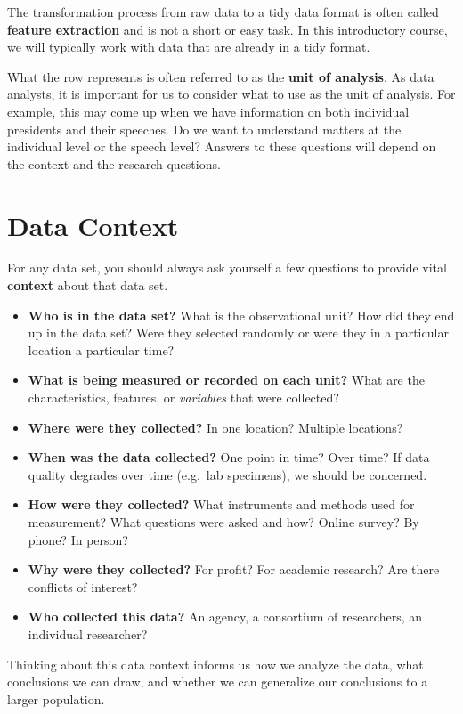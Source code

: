 \documentclass[
]{book}
\begin{document}
The transformation process from raw data to a tidy data format is often called \textbf{feature extraction} and is not a short or easy task. In this introductory course, we will typically work with data that are already in a tidy format.

What the row represents is often referred to as the \textbf{unit of analysis}. As data analysts, it is important for us to consider what to use as the unit of analysis. For example, this may come up when we have information on both individual presidents and their speeches. Do we want to understand matters at the individual level or the speech level? Answers to these questions will depend on the context and the research questions.

\hypertarget{data-context}{%
\section{Data Context}\label{data-context}}

For any data set, you should always ask yourself a few questions to provide vital \textbf{context} about that data set.

\begin{itemize}
\item
  \textbf{Who is in the data set?} What is the observational unit? How did they end up in the data set? Were they selected randomly or were they in a particular location a particular time?
\item
  \textbf{What is being measured or recorded on each unit?} What are the characteristics, features, or \emph{variables} that were collected?
\item
  \textbf{Where were they collected?} In one location? Multiple locations?
\item
  \textbf{When was the data collected?} One point in time? Over time? If data quality degrades over time (e.g.~lab specimens), we should be concerned.
\item
  \textbf{How were they collected?} What instruments and methods used for measurement? What questions were asked and how? Online survey? By phone? In person?
\item
  \textbf{Why were they collected?} For profit? For academic research? Are there conflicts of interest?
\item
  \textbf{Who collected this data?} An agency, a consortium of researchers, an individual researcher?
\end{itemize}

Thinking about this data context informs us how we analyze the data, what conclusions we can draw, and whether we can generalize our conclusions to a larger population.
\end{document}
